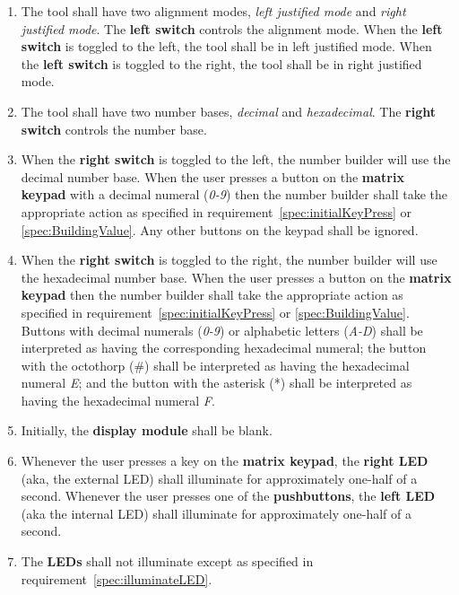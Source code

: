 \begin{enumerate}
    \item The tool shall have two alignment modes, \textit{left justified mode} and \textit{right justified mode}. The \textbf{left switch} controls the alignment mode.
        When the \textbf{left switch} is toggled to the left, the tool shall be in left justified mode.
        When the \textbf{left switch} is toggled to the right, the tool shall be in right justified mode.
    \item The tool shall have two number bases, \textit{decimal} and \textit{hexadecimal}.
        The \textbf{right switch} controls the number base.
    \item \label{spec:decimalExplained} When the \textbf{right switch} is toggled to the left, the number builder will use the decimal number base.
        When the user presses a button on the \textbf{matrix keypad} with a decimal numeral (\textit{0-9}) then the number builder shall take the appropriate action as specified in requirement~\ref{spec:initialKeyPress} or \ref{spec:BuildingValue}.
        Any other buttons on the keypad shall be ignored.
    \item \label{spec:hexadecimalExplained} When the \textbf{right switch} is toggled to the right, the number builder will use the hexadecimal number base.
        When the user presses a button on the \textbf{matrix keypad} then the number builder shall take the appropriate action as specified in requirement~\ref{spec:initialKeyPress} or \ref{spec:BuildingValue}.
        Buttons with decimal numerals (\textit{0-9}) or alphabetic letters (\textit{A-D}) shall be interpreted as having the corresponding hexadecimal numeral;
        the button with the octothorp (\#) shall be interpreted as having the hexadecimal numeral \textit{E};
        and the button with the asterisk (*) shall be interpreted as having the hexadecimal numeral \textit{F}.
    \item Initially, the \textbf{display module} shall be blank.
    \item \label{spec:illuminateLED} Whenever the user presses a key on the \textbf{matrix keypad}, the \textbf{right LED} (aka, the external LED) shall illuminate for approximately one-half of a second.
        Whenever the user presses one of the \textbf{pushbuttons}, the \textbf{left LED} (aka the internal LED) shall illuminate for approximately one-half of a second.
    \item \label{spec:LEDoffWhenOtherwise} The \textbf{LEDs} shall not illuminate except as specified in requirement~\ref{spec:illuminateLED}.

\end{enumerate}
